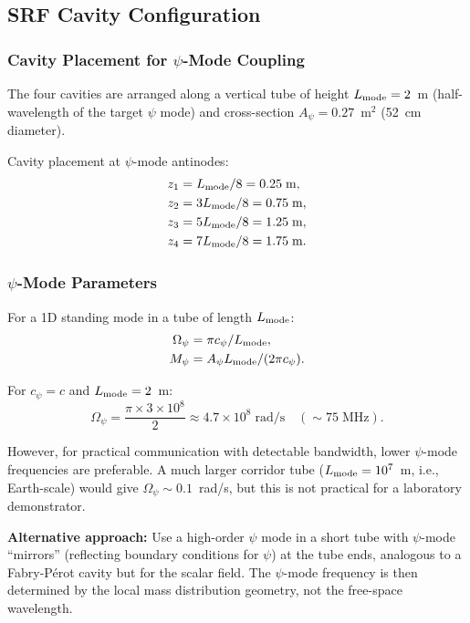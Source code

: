 \documentclass[11pt,onecolumn]{article}
\begin{document}
\subsection{SRF Cavity Configuration}

\subsubsection{Cavity Placement for $\psi$-Mode Coupling}

The four cavities are arranged along a vertical tube of height
$L_{\rm mode} = 2$~m (half-wavelength of the target $\psi$ mode)
and cross-section $A_\psi = 0.27$~m$^2$ (52~cm diameter).

Cavity placement at $\psi$-mode antinodes:
\begin{align}
z_1 &= L_{\rm mode}/8 = 0.25\;\text{m}, \\
z_2 &= 3L_{\rm mode}/8 = 0.75\;\text{m}, \\
z_3 &= 5L_{\rm mode}/8 = 1.25\;\text{m}, \\
z_4 &= 7L_{\rm mode}/8 = 1.75\;\text{m}.
\end{align}

\subsubsection{$\psi$-Mode Parameters}

For a 1D standing mode in a tube of length $L_{\rm mode}$:
\begin{align}
\Omega_\psi &= \pi c_\psi / L_{\rm mode}, \\
M_\psi &= A_\psi L_{\rm mode} / (2\pi c_\psi).
\end{align}

For $c_\psi = c$ and $L_{\rm mode} = 2$~m:
\begin{equation}
\Omega_\psi = \frac{\pi \times 3 \times 10^8}{2} \approx 4.7 \times 10^8\;\text{rad/s}
\quad (\sim 75\;\text{MHz}).
\end{equation}

However, for practical communication with detectable bandwidth, lower
$\psi$-mode frequencies are preferable.
A much larger corridor tube ($L_{\rm mode} = 10^7$~m, i.e.,
Earth-scale) would give $\Omega_\psi \sim 0.1$~rad/s, but this is
not practical for a laboratory demonstrator.

\textbf{Alternative approach:}
Use a high-order $\psi$ mode in a short tube with $\psi$-mode ``mirrors''
(reflecting boundary conditions for $\psi$) at the tube ends, analogous
to a Fabry-P\'{e}rot cavity but for the scalar field.
The $\psi$-mode frequency is then determined by the local mass
distribution geometry, not the free-space wavelength.
\end{document}
